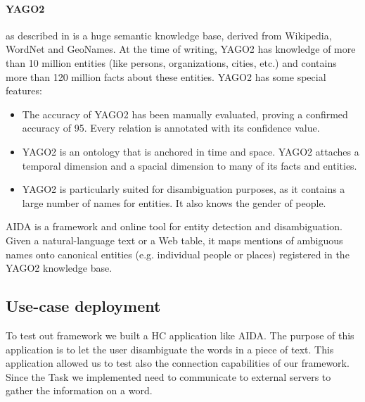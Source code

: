 \paragraph{YAGO2} as described in \cite{hoffart2010yago2} is a huge semantic
knowledge base, derived from Wikipedia, WordNet and GeoNames. At the time of
writing, YAGO2 has knowledge of more than 10 million entities (like persons,
organizations, cities, etc.) and contains more than 120 million facts about these
entities. YAGO2 has some special features:
\begin{itemize}
    \item The accuracy of YAGO2 has been manually evaluated, proving a confirmed
    accuracy of 95. Every relation is annotated with its confidence value.
    \item YAGO2 is an ontology that is anchored in time and space. YAGO2 attaches
    a temporal dimension and a spacial dimension to many of its facts and entities.
    \item YAGO2 is particularly suited for disambiguation purposes, as it
    contains a large number of names for entities. It also knows the gender of
    people.
\end{itemize}

\noindent AIDA is a framework and online tool for entity detection and disambiguation. Given
a natural-language text or a Web table, it maps mentions of ambiguous names onto
canonical entities (e.g. individual people or places) registered in the YAGO2
knowledge base. 


\subsection{Use-case deployment}
To test out framework we built a \acl{HC} application like AIDA. The purpose of
this application is to let the user disambiguate the words in a piece of text.
This application allowed us to test also the connection capabilities of our
framework. Since the Task we implemented need to communicate to external servers
to gather the information on a word.